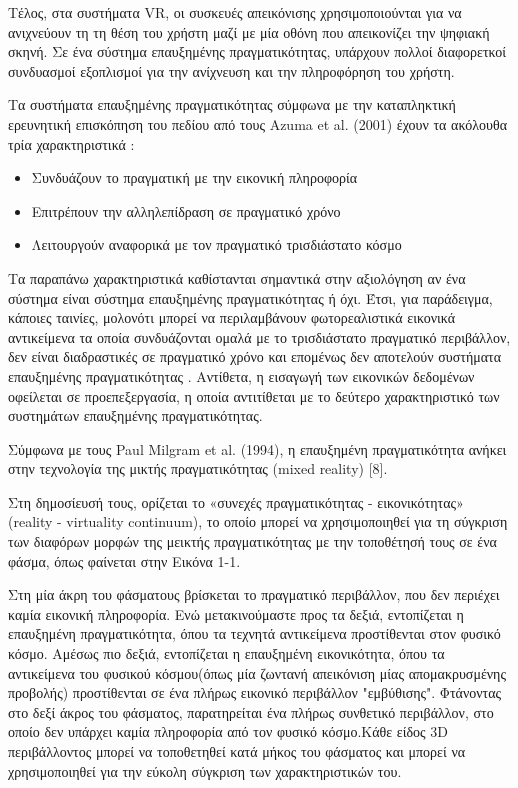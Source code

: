 Τέλος, στα συστήματα VR, οι συσκευές απεικόνισης χρησιμοποιούνται για να ανιχνεύουν τη τη θέση του χρήστη μαζί με μία οθόνη που απεικονίζει την ψηφιακή σκηνή. Σε ένα σύστημα επαυξημένης πραγματικότητας, υπάρχουν πολλοί διαφορετκοί συνδυασμοί εξοπλισμοί για την ανίχνευση και την πληροφόρηση του χρήστη.

Τα συστήματα επαυξημένης πραγματικότητας σύμφωνα με την καταπληκτική ερευνητική επισκόπηση του πεδίου από τους Azuma et al. (2001) έχουν τα ακόλουθα τρία χαρακτηριστικά \cite{azuma2001}:

\begin{itemize}
\item Συνδυάζουν το πραγματική με την εικονική πληροφορία
\item Επιτρέπουν την αλληλεπίδραση σε πραγματικό χρόνο
\item Λειτουργούν αναφορικά με τον πραγματικό τρισδιάστατο κόσμο
\end{itemize}  


Τα παραπάνω χαρακτηριστικά καθίστανται σημαντικά στην αξιολόγηση αν ένα σύστημα είναι σύστημα επαυξημένης πραγματικότητας ή όχι. Έτσι, για παράδειγμα, κάποιες ταινίες, μολονότι μπορεί να περιλαμβάνουν φωτορεαλιστικά εικονικά αντικείμενα τα οποία συνδυάζονται ομαλά με το τρισδιάστατο πραγματικό περιβάλλον, δεν είναι διαδραστικές σε πραγματικό χρόνο και επομένως δεν αποτελούν συστήματα επαυξημένης πραγματικότητας \cite{azuma1997}. Αντίθετα, η εισαγωγή των εικονικών δεδομένων οφείλεται σε προεπεξεργασία, η οποία αντιτίθεται με το δεύτερο χαρακτηριστικό των συστημάτων επαυξημένης πραγματικότητας.

Σύμφωνα με τους Paul Milgram et al. (1994), η επαυξημένη πραγματικότητα ανήκει στην τεχνολογία της μικτής πραγματικότητας (mixed reality) [8].

Στη δημοσίευσή τους, ορίζεται το «συνεχές πραγματικότητας - εικονικότητας» (reality - virtuality continuum), το οποίο μπορεί να χρησιμοποιηθεί για τη σύγκριση των διαφόρων μορφών της μεικτής πραγματικότητας με την τοποθέτησή τους σε ένα φάσμα, όπως φαίνεται στην Εικόνα 1-1. 

Στη μία άκρη του φάσματους βρίσκεται το πραγματικό περιβάλλον, που δεν περιέχει καμία εικονική πληροφορία. Ενώ μετακινούμαστε προς τα δεξιά, εντοπίζεται η επαυξημένη πραγματικότητα, όπου τα τεχνητά αντικείμενα προστίθενται στον φυσικό κόσμο. Αμέσως πιο δεξιά, εντοπίζεται η επαυξημένη εικονικότητα, όπου τα αντικείμενα του φυσικού κόσμου(όπως μία ζωντανή απεικόνιση μίας απομακρυσμένης προβολής) προστίθενται σε ένα πλήρως εικονικό περιβάλλον "εμβύθισης". Φτάνοντας στο δεξί άκρος του φάσματος, παρατηρείται ένα πλήρως συνθετικό περιβάλλον, στο οποίο δεν υπάρχει καμία πληροφορία από τον φυσικό κόσμο.Κάθε είδος 3D περιβάλλοντος μπορεί να τοποθετηθεί κατά μήκος του φάσματος και μπορεί να χρησιμοποιηθεί για την εύκολη σύγκριση των χαρακτηριστικών του.

